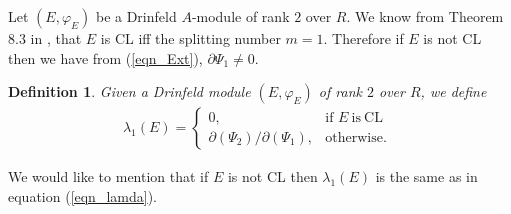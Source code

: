\documentclass{amsart}
\newtheorem {definition}[theorem]{\bf Definition}
\numberwithin {equation}{section}
\def \mb{\mbox}
\begin{document}
\bigskip


 Let $(E,\varphi_{E})$ be a Drinfeld $A$-module of rank $2$ over $R$. We know from Theorem 8.3 in \cite{BS b}, that $E$ is CL iff  the splitting number $m=1$. Therefore if $E$ is not CL then we have from (\ref{eqn_Ext}),  $\partial \Psi_{1}\neq 0$.
 
\begin{definition} Given a  Drinfeld module $(E,\varphi_{E})$ of rank $2$ over $R$, we define 
\begin{align*}
\lambda_{1}(E)=\left\{\begin{array}{ll}
		0, & \mb{if } E~ \mathrm{is~ CL}\\
\partial(\Psi_{2})/\partial(\Psi_{1}), & \mb{otherwise. }
	\end{array} 
	\right.
\end{align*}

\end{definition}
We would like to mention that if $E$ is not CL then $\lambda_{1}(E)$ is the same as in equation (\ref{eqn_lamda}).
\end{document}
